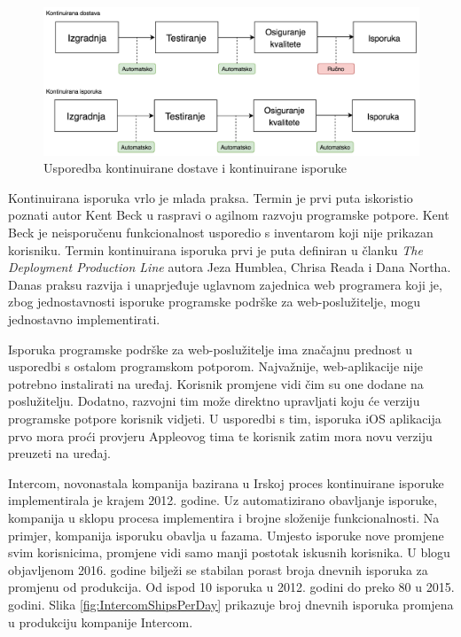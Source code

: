 \documentclass[times, utf8, diplomski, numeric]{fer}
\begin{document}
\begin{figure}
\centering
\includegraphics[scale=0.55]{CDDifferences}
\caption{Usporedba kontinuirane dostave i kontinuirane isporuke}
\label{fig:CDDifferences}
\end{figure}

Kontinuirana isporuka vrlo je mlada praksa. Termin je prvi puta iskoristio poznati autor Kent Beck u raspravi o agilnom razvoju programske potpore. Kent Beck je neisporučenu funkcionalnost usporedio s inventarom koji nije prikazan korisniku. Termin kontinuirana isporuka prvi je puta definiran u članku \textit{The Deployment Production Line} autora Jeza Humblea, Chrisa Reada i Dana Northa\citep{mics:DPT}. Danas praksu razvija i unaprjeđuje uglavnom zajednica web programera koji je, zbog jednostavnosti isporuke programske podrške za web-poslužitelje, mogu jednostavno implementirati.

Isporuka programske podrške za web-poslužitelje ima značajnu prednost u usporedbi s ostalom programskom potporom. Najvažnije, web-aplikacije nije potrebno instalirati na uređaj. Korisnik promjene vidi čim su one dodane na poslužitelju. Dodatno, razvojni tim može direktno upravljati koju će verziju programske potpore korisnik vidjeti. U usporedbi s tim, isporuka iOS aplikacija prvo mora proći provjeru Appleovog tima te korisnik zatim mora novu verziju preuzeti na uređaj.

Intercom, novonastala kompanija bazirana u Irskoj proces kontinuirane isporuke implementirala je krajem 2012. godine. Uz automatizirano obavljanje isporuke, kompanija u sklopu procesa implementira i brojne složenije funkcionalnosti. Na primjer, kompanija isporuku obavlja u fazama. Umjesto isporuke nove promjene svim korisnicima, promjene vidi samo manji postotak iskusnih korisnika. U blogu objavljenom 2016. godine bilježi se stabilan porast broja dnevnih isporuka za promjenu od produkcija. Od ispod 10 isporuka u 2012. godini do preko 80 u 2015. godini. Slika \ref{fig:IntercomShipsPerDay} prikazuje broj dnevnih isporuka promjena u produkciju kompanije Intercom\citep{intercom:cd}.
\end{document}
